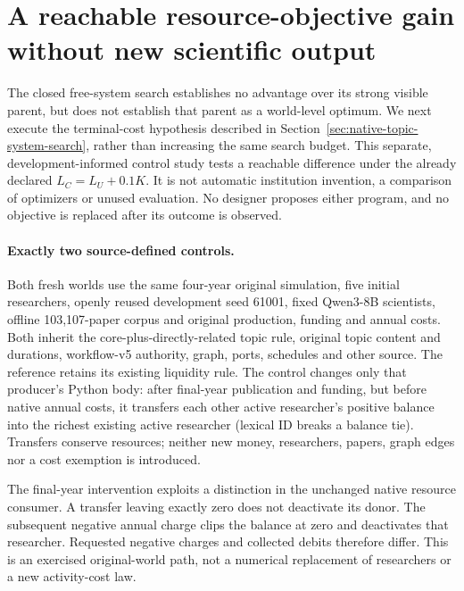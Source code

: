 \section{A reachable resource-objective gain without new scientific output}
\label{sec:native-terminal-cost}

The closed free-system search establishes no advantage over its strong visible
parent, but does not establish that parent as a world-level optimum.
We next execute the terminal-cost hypothesis described in
Section~\ref{sec:native-topic-system-search}, rather than increasing the same
search budget. This separate, development-informed control study tests a
reachable difference under the already declared $L_C=L_U+0.1K$. It is not
automatic institution invention, a comparison of optimizers or unused evaluation.
No designer proposes either program, and no objective is replaced after its
outcome is observed.

\paragraph{Exactly two source-defined controls.}
Both fresh worlds use the same four-year original simulation, five initial
researchers, openly reused development seed 61001, fixed Qwen3-8B scientists,
offline 103,107-paper corpus and original production, funding and annual costs.
Both inherit the core-plus-directly-related topic rule, original topic content
and durations, workflow-v5 authority, graph, ports, schedules and other source.
The reference retains its existing liquidity rule. The control changes only
that producer's Python body: after final-year publication and funding, but
before native annual costs, it transfers each other active researcher's
positive balance into the richest existing active researcher (lexical ID
breaks a balance tie). Transfers conserve resources; neither new money,
researchers, papers, graph edges nor a cost exemption is introduced.

The final-year intervention exploits a distinction in the unchanged native
resource consumer. A transfer leaving exactly zero does not deactivate its
donor. The subsequent negative annual charge clips the balance at zero and
deactivates that researcher. Requested negative charges and collected debits
therefore differ. This is an exercised original-world path, not a numerical
replacement of researchers or a new activity-cost law.

